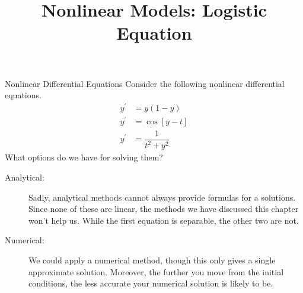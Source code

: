 \documentclass{beamer}
\title[MA245 - Section 2.5]{Nonlinear Models: Logistic Equation}
\begin{document}
\begin{frame}
\titlepage
\end{frame}

\begin{frame}
\begin{block}{Nonlinear Differential Equations}
Consider the following nonlinear differential equations.
\begin{equation*}
\begin{aligned}
y^\prime &= y(1-y) \\
y^\prime &= \cos[y-t] \\
y^\prime &= \dfrac{1}{t^2+y^2}
\end{aligned}
\end{equation*}
What options do we have for solving them?\pause

\begin{description}
\item[Analytical:] Sadly, analytical methods cannot always provide formulas for a solutions. Since none of these are linear, the methods we have discussed this chapter won't help us. While the first equation is separable, the other two are not.

\item[Numerical:] We could apply a numerical method, though this only gives a single approximate solution. Moreover, the further you move from the initial conditions, the less accurate your numerical solution is likely to be.
\end{description}
\end{block}
\end{frame}
\end{document}
